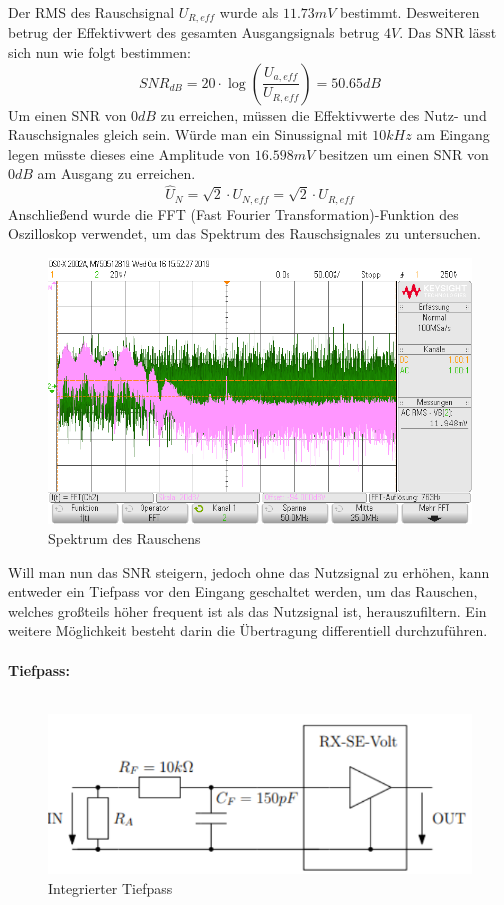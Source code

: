 \documentclass[a4paper,12pt]{article}
\begin{document}
	\noindent
	Der RMS des Rauschsignal $U_{R,eff}$ wurde als $11.73mV$ bestimmt. Desweiteren betrug der Effektivwert des gesamten Ausgangsignals betrug $4V$. Das SNR lässt sich nun wie folgt bestimmen:
	\[
		SNR_{dB} = 20 \cdot \log \left( \frac{U_{a,eff}}{U_{R,eff}}\right) = 50.65dB
	\]
	Um einen SNR von $0dB$ zu erreichen, müssen die Effektivwerte des Nutz- und Rauschsignales gleich sein.
	Würde man ein Sinussignal mit $10kHz$ am Eingang legen müsste dieses eine Amplitude von $16.598mV$ besitzen um einen SNR von $0dB$ am Ausgang zu erreichen.
	\[
		\hat{U}_N = \sqrt{2} \cdot U_{N,eff} = \sqrt{2} \cdot U_{R,eff}
	\]
	Anschließend wurde die FFT (Fast Fourier Transformation)-Funktion des Oszilloskop verwendet, um das Spektrum des Rauschsignales zu untersuchen.
	\begin{figure}[h]
		\centering
		\includegraphics[width=13cm]{img/FFT}
		\caption{Spektrum des Rauschens}
	\end{figure}
	\newline
	Will man nun das SNR steigern, jedoch ohne das Nutzsignal zu erhöhen, kann entweder ein Tiefpass vor den Eingang geschaltet werden, um das Rauschen, welches großteils höher frequent ist als das Nutzsignal ist, herauszufiltern. Ein weitere Möglichkeit besteht darin die Übertragung differentiell durchzuführen. \\ \\
	\textbf{Tiefpass:} \\ \\
	\begin{figure}[h]
		\centering
		\includegraphics[width=15cm]{img/Tiefpass}
		\caption{Integrierter Tiefpass}
	\end{figure}
\end{document}
